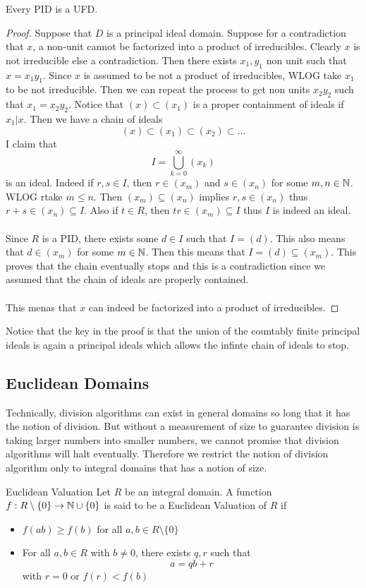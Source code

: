 \documentclass[a4paper]{article}
\begin{document}
\begin{prp}{}{} Every PID is a UFD. \tcbline
\begin{proof}
Suppose that $D$ is a principal ideal domain. Suppose for a contradiction that $x$, a non-unit cannot be factorized into a product of irreducibles. Clearly $x$ is not irreducible else a contradiction. Then there exists $x_1,y_1$ non unit such that $x=x_1y_1$. Since $x$ is assumed to be not a product of irreducibles, WLOG take $x_1$ to be not irreducible. Then we can repeat the process to get non units $x_2y_2$ such that $x_1=x_2y_2$. Notice that $(x)\subset(x_1)$ is a proper containment of ideals if $x_1|x$. Then we have a chain of ideals $$(x)\subset(x_1)\subset(x_2)\subset\dots$$ I claim that $$I=\bigcup_{k=0}^\infty(x_k)$$ is an ideal. Indeed if $r,s\in I$, then $r\in(x_m)$ and $s\in(x_n)$ for some $m,n\in\mathbb{N}$. WLOG rtake $m\leq n$. Then $(x_m)\subseteq(x_n)$ implies $r,s\in(x_n)$ thus $r+s\in(x_n)\subseteq I$. Also if $t\in R$, then $tr\in(x_m)\subseteq I$ thus $I$ is indeed an ideal. \\~\\
Since $R$ is a PID, there exists some $d\in I$ such that $I=(d)$. This also means that $d\in(x_m)$ for some $m\in\mathbb{N}$. Then this means that $I=(d)\subseteq(x_m)$. This proves that the chain eventually stops and this is a contradiction since we assumed that the chain of ideals are properly contained. \\~\\
This menas that $x$ can indeed be factorized into a product of irreducibles. 
\end{proof}
\end{prp}

Notice that the key in the proof is that the union of the countably finite principal ideals is again a principal ideals which allows the infinte chain of ideals to stop. 

\subsection{Euclidean Domains}
Technically, division algorithms can exist in general domains so long that it has the notion of division. But without a measurement of size to guarantee division is taking larger numbers into smaller numbers, we cannot promise that division algorithms will halt eventually. Therefore we restrict the notion of division algorithm only to integral domains that has a notion of size. 

\begin{defn}{Euclidean Valuation}{} Let $R$ be an integral domain. A function $f:R\setminus\{0\}\to\mathbb{N}\cup\{0\}$ is said to be a Euclidean Valuation of $R$ if
\begin{itemize}
\item $f(ab)\geq f(b)$ for all $a,b\in R\setminus\{0\}$
\item For all $a,b\in R$ with $b\neq0$, there exists $q,r$ such that $$a=qb+r$$ with $r=0$ or $f(r)<f(b)$
\end{itemize}
\end{defn}
\end{document}
